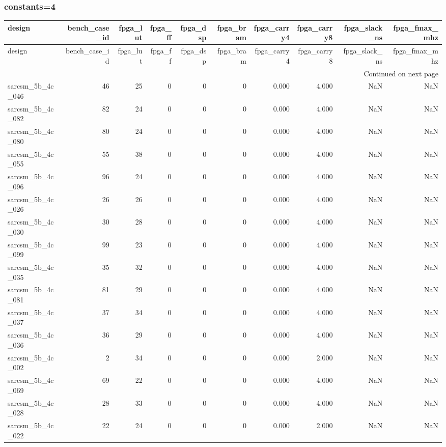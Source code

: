 \documentclass{article}
\begin{document}
\subsubsection*{constants=4}
\begin{longtable}{lrrrrrrrrr}
\toprule
design & bench\_case\_id & fpga\_lut & fpga\_ff & fpga\_dsp & fpga\_bram & fpga\_carry4 & fpga\_carry8 & fpga\_slack\_ns & fpga\_fmax\_mhz \\
\midrule
\endfirsthead
\toprule
design & bench\_case\_id & fpga\_lut & fpga\_ff & fpga\_dsp & fpga\_bram & fpga\_carry4 & fpga\_carry8 & fpga\_slack\_ns & fpga\_fmax\_mhz \\
\midrule
\endhead
\midrule
\multicolumn{10}{r}{Continued on next page} \\
\midrule
\endfoot
\bottomrule
\endlastfoot
sarcsm\_5b\_4c\_046 & 46 & 25 & 0 & 0 & 0 & 0.000 & 4.000 & NaN & NaN \\
sarcsm\_5b\_4c\_082 & 82 & 24 & 0 & 0 & 0 & 0.000 & 4.000 & NaN & NaN \\
sarcsm\_5b\_4c\_080 & 80 & 24 & 0 & 0 & 0 & 0.000 & 4.000 & NaN & NaN \\
sarcsm\_5b\_4c\_055 & 55 & 38 & 0 & 0 & 0 & 0.000 & 4.000 & NaN & NaN \\
sarcsm\_5b\_4c\_096 & 96 & 24 & 0 & 0 & 0 & 0.000 & 4.000 & NaN & NaN \\
sarcsm\_5b\_4c\_026 & 26 & 26 & 0 & 0 & 0 & 0.000 & 4.000 & NaN & NaN \\
sarcsm\_5b\_4c\_030 & 30 & 28 & 0 & 0 & 0 & 0.000 & 4.000 & NaN & NaN \\
sarcsm\_5b\_4c\_099 & 99 & 23 & 0 & 0 & 0 & 0.000 & 4.000 & NaN & NaN \\
sarcsm\_5b\_4c\_035 & 35 & 32 & 0 & 0 & 0 & 0.000 & 4.000 & NaN & NaN \\
sarcsm\_5b\_4c\_081 & 81 & 29 & 0 & 0 & 0 & 0.000 & 4.000 & NaN & NaN \\
sarcsm\_5b\_4c\_037 & 37 & 34 & 0 & 0 & 0 & 0.000 & 4.000 & NaN & NaN \\
sarcsm\_5b\_4c\_036 & 36 & 29 & 0 & 0 & 0 & 0.000 & 4.000 & NaN & NaN \\
sarcsm\_5b\_4c\_002 & 2 & 34 & 0 & 0 & 0 & 0.000 & 2.000 & NaN & NaN \\
sarcsm\_5b\_4c\_069 & 69 & 22 & 0 & 0 & 0 & 0.000 & 4.000 & NaN & NaN \\
sarcsm\_5b\_4c\_028 & 28 & 33 & 0 & 0 & 0 & 0.000 & 4.000 & NaN & NaN \\
sarcsm\_5b\_4c\_022 & 22 & 24 & 0 & 0 & 0 & 0.000 & 2.000 & NaN & NaN \\

\end{longtable}
\end{document}
